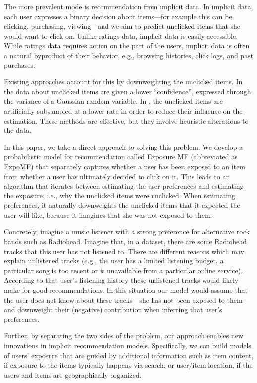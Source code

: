 The more prevalent mode is recommendation from implicit data.  In
implicit data, each user expresses a binary decision about items---for
example this can be clicking, purchasing, viewing---and we aim to
predict unclicked items that she would want to click on. Unlike
ratings data, implicit data is easily accessible.  While ratings data
requires action on the part of the users, implicit data is often a
natural byproduct of their behavior, e.g., browsing histories, click
logs, and past purchases.



Existing approaches account for this by downweighting the unclicked
items.  In \citet{hu2008collaborative} the data about unclicked items are given a
lower ``confidence'', expressed through the variance of a Gaussian
random variable.  In \citet{rendle2009bpr}, the unclicked items are artificially
subsampled at a lower rate in order to reduce their influence on the
estimation.  These methods are effective, but they involve heuristic
alterations to the data.

In this paper, we take a direct approach to solving this problem.  We
develop a probabilistic model for recommendation called Exposure MF
(abbreviated as ExpoMF) that separately captures whether a user has been exposed to an item from
whether a user has ultimately decided to click on it.  This leads to an
algorithm that iterates between estimating the user preferences and
estimating the exposure, i.e., why the unclicked items were unclicked.
When estimating preferences, it naturally downweights the unclicked items
that it expected the user will like, because it imagines that she was not
exposed to them. 

Concretely, imagine a music listener with a strong preference for alternative
rock bands such as Radiohead. Imagine that, in a dataset, there are some
Radiohead tracks that this user has not listened to. There are different
reasons which may explain unlistened tracks  (e.g., the user has a limited
listening budget, a particular song is too recent or is unavailable from a
particular online service). According to that user's listening history these
unlistened tracks would likely make for good recommendations. In this situation
our model would assume that the user does not know about these tracks---she has
not been exposed to them---and downweight their (negative) contribution when
inferring that user's preferences.

Further, by separating the two sides of the problem, our approach
enables new innovations in implicit recommendation
models. Specifically, we can build models of users' exposure that
are guided by additional information such as item content, if
exposure to the items typically happens via search, or user/item
location, if the users and items are geographically organized.  

